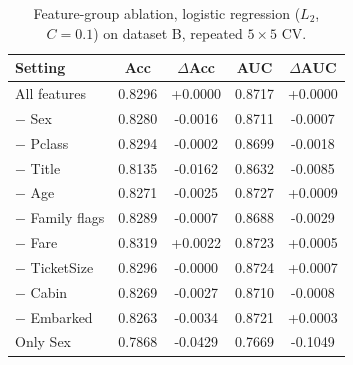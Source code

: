 \begin{table}[t]
\centering\small
\caption{Feature-group ablation, logistic regression ($L_2$, $C{=}0.1$) on dataset B, repeated $5\times5$ CV.}
\label{tab:ablation}
\begin{tabular}{lcccc}
\toprule
Setting & Acc & $\Delta$Acc & AUC & $\Delta$AUC \\
\midrule
All features & 0.8296 & +0.0000 & 0.8717 & +0.0000 \\
$-$ Sex & 0.8280 & -0.0016 & 0.8711 & -0.0007 \\
$-$ Pclass & 0.8294 & -0.0002 & 0.8699 & -0.0018 \\
$-$ Title & 0.8135 & -0.0162 & 0.8632 & -0.0085 \\
$-$ Age & 0.8271 & -0.0025 & 0.8727 & +0.0009 \\
$-$ Family flags & 0.8289 & -0.0007 & 0.8688 & -0.0029 \\
$-$ Fare & 0.8319 & +0.0022 & 0.8723 & +0.0005 \\
$-$ TicketSize & 0.8296 & -0.0000 & 0.8724 & +0.0007 \\
$-$ Cabin & 0.8269 & -0.0027 & 0.8710 & -0.0008 \\
$-$ Embarked & 0.8263 & -0.0034 & 0.8721 & +0.0003 \\
Only Sex & 0.7868 & -0.0429 & 0.7669 & -0.1049 \\
\bottomrule
\end{tabular}
\end{table}
